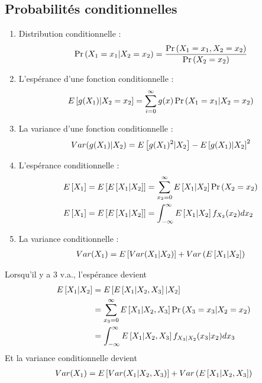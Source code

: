 \documentclass[10pt, french, landscape]{article}
\begin{document}
\small
\begin{multicols*}{3} %
\section{Probabilités conditionnelles}
\begin{enumerate}[label=\faAngleRight]
\item Distribution conditionnelle : 
\begin{align*}
\Pr \left( X_1 = x_1 | X_2 = x_2 \right) & = \frac{\Pr \left( X_1 = x_1, X_2 = x_2 \right)}{\Pr \left( X_2 = x_2 \right)} \\
\end{align*}

\item L'espérance d'une fonction conditionnelle : 
\begin{align*}
E \left[ g(X_1) | X_2 = x_2 \right] = \sum_{i=0}^{\infty} g(x) \Pr \left( X_1 = x_1 | X_2 = x_2 \right)
\end{align*}

\item La variance d'une fonction conditionnelle :
\begin{align*}
Var(g(X_1) | X_2) = E \left[ g(X_1)^2 |X_2 \right] - E \left[ g(X_1) | X_2 \right]^2
\end{align*}

\item L'espérance conditionnelle : 
\begin{align*}
E \left[ X_1 \right] 	& = E \left[ E \left[ X_1 | X_2 \right] \right] = \sum_{x_2 = 0}^{\infty} E \left[ X_1 | X_2 \right] \Pr \left( X_2 = x_2 \right) \\
E \left[ X_1 \right]	& = E \left[ E \left[ X_1 | X_2 \right] \right] = \int_{-\infty}^{\infty} E \left[ X_1 | X_2 \right] f_{X_2}(x_2) d x_2 \\
\end{align*}

\item La variance conditionnelle : 
\begin{align*}
Var(X_1) = E \left[ Var(X_1 | X_2) \right] + Var\left( E \left[ X_1 | X_2 \right] \right)
\end{align*}
\end{enumerate}

Lorsqu'il y a 3 v.a., l'espérance devient
\begin{align*}
E \left[ X_1 | X_2 \right]	& = E \left[ E \left[ X_1 | X_2, X_3 \right] | X_2 \right] \\
	& = \sum_{x_3 = 0}^{\infty} E \left[ X_1 | X_2, X_3 \right] \Pr \left( X_3 = x_3 | X_2 = x_2 \right) \\
	& = \int_{-\infty}^{\infty} E \left[ X_1 | X_2, X_3 \right] f_{X_3| X_2}(x_3 | x_2) dx_3
\end{align*}
Et la variance conditionnelle devient
\begin{align*}
Var(X_1) = E \left[ Var(X_1 | X_2, X_3) \right]  + Var \left( E \left[ X_1 | X_2, X_3 \right] \right)
\end{align*}


\end{multicols*}
\end{document}
